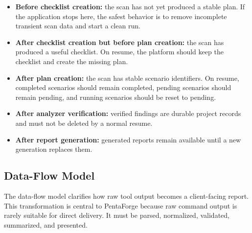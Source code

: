 \documentclass[12pt,a4paper]{report}
\begin{document}
\begin{itemize}
    \item \textbf{Before checklist creation:} the scan has not yet produced a stable
    plan. If the application stops here, the safest behavior is to remove incomplete
    transient scan data and start a clean run.
    \item \textbf{After checklist creation but before plan creation:} the scan has
    produced a useful checklist. On resume, the platform should keep the checklist and
    create the missing plan.
    \item \textbf{After plan creation:} the scan has stable scenario identifiers. On
    resume, completed scenarios should remain completed, pending scenarios should remain
    pending, and running scenarios should be reset to pending.
    \item \textbf{After analyzer verification:} verified findings are durable project
    records and must not be deleted by a normal resume.
    \item \textbf{After report generation:} generated reports remain available until a
    new generation replaces them.
\end{itemize}

\subsection{Data-Flow Model}

The data-flow model clarifies how raw tool output becomes a client-facing report. This
transformation is central to PentaForge because raw command output is rarely suitable
for direct delivery. It must be parsed, normalized, validated, summarized, and
presented.
\end{document}
